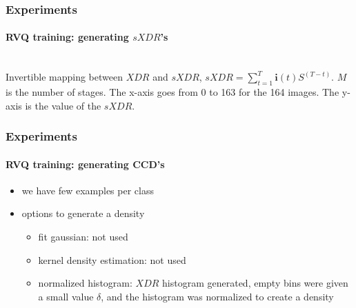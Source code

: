 


\begin{frame}
\frametitle{Experiments}
\framesubtitle{RVQ training: generating $sXDR$'s}
\mypagenum
	\\{\tiny Invertible mapping between $XDR$ and $sXDR$, $sXDR =\sum\limits_{t=1}^{T}\mathbf{i}(t)S^{(T-t)}$.  $M$ is the number of stages.  The x-axis goes from 0 to 163 for the 164 images.  The y-axis is the value of the $sXDR$.}
\end{frame}


\begin{frame}
\frametitle{Experiments}
\framesubtitle{RVQ training: generating CCD's}
	\begin{itemize}
		\item we have few examples per class
		\item options to generate a density
			\begin{itemize}
				\item {\color{blue}fit gaussian}: not used
				\item {\color{blue}kernel density estimation}: not used
				\item {\color{blue}normalized histogram}: $XDR$ histogram generated, empty bins were given a small value $\delta$, and the histogram was normalized to create a density 
			\end{itemize}
	\end{itemize}
\logoCSIPCPL\mypagenum
\end{frame}


